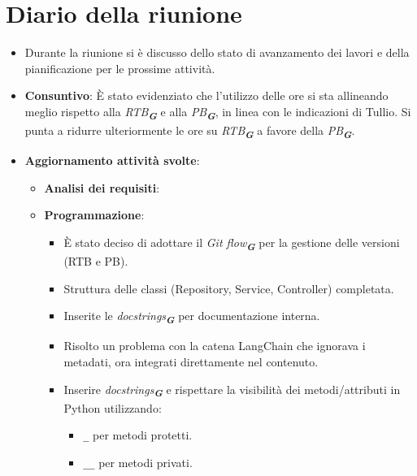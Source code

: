 
\section{Diario della riunione}

\begin{itemize}
    \item Durante la riunione si è discusso dello stato di avanzamento dei lavori e della pianificazione per le prossime attività.  

    \item \textbf{Consuntivo}:  
    È stato evidenziato che l'utilizzo delle ore si sta allineando meglio rispetto alla \emph{RTB}\textsubscript{\textit{\textbf{G}}} e alla \emph{PB}\textsubscript{\textit{\textbf{G}}}, in linea con le indicazioni di Tullio. Si punta a ridurre ulteriormente le ore su \emph{RTB}\textsubscript{\textit{\textbf{G}}} a favore della \emph{PB}\textsubscript{\textit{\textbf{G}}}.  

    \item \textbf{Aggiornamento attività svolte}:  
    \begin{itemize}
        \item \textbf{Analisi dei requisiti}:  

        \item \textbf{Programmazione}:  
        \begin{itemize}
            \item È stato deciso di adottare il \emph{Git flow}\textsubscript{\textit{\textbf{G}}} per la gestione delle versioni (RTB e PB). 
            \item Struttura delle classi (Repository, Service, Controller) completata.  
            \item Inserite le \emph{docstrings}\textsubscript{\textit{\textbf{G}}} per documentazione interna.  
            \item Risolto un problema con la catena LangChain che ignorava i metadati, ora integrati direttamente nel contenuto.  
            \item Inserire \emph{docstrings}\textsubscript{\textit{\textbf{G}}} e rispettare la visibilità dei metodi/attributi in Python utilizzando:  
            \begin{itemize}
                \item \texttt{\_} per metodi protetti.  
                \item \texttt{\_\_} per metodi privati.  
            \end{itemize}
        \end{itemize}


\end{itemize}
\end{itemize}
